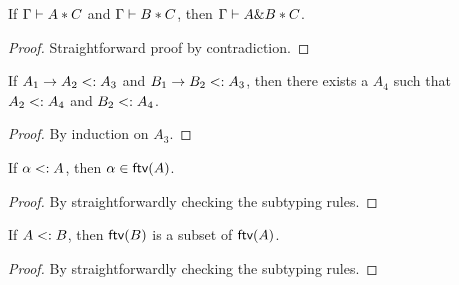 \begin{theorem}
  \label{theorem:disjoint-intersect}

  If $\Gamma \vdash A * C$ and $\Gamma \vdash B * C$,
  then $\Gamma \vdash A \& B * C$.
\end{theorem}

\begin{proof}
  Straightforward proof by contradiction.
\end{proof}

\begin{lemma}
  \label{lemma:common-supertype}

  If $A_1 \to A_2 <: A_3$ and $B_1 \to B_2 <: A_3$,
  then there exists a $A_4$ such that $A_2 <: A_4$ and $B_2 <: A_4$.
\end{lemma}

\begin{proof}
  By induction on $A_3$. 
\end{proof}

\begin{lemma}
  \label{lemma:subtype-ftv-var}

  If $\alpha <: A$, then $\alpha \in \textsf{ftv}(A)$.
\end{lemma}

\begin{proof}
  By straightforwardly checking the subtyping rules.
\end{proof}

\begin{lemma}
  \label{lemma:subtype-ftv}

  If $A <: B$, then $\textsf{ftv}(B)$ is a subset of $\textsf{ftv}(A)$.
\end{lemma}

\begin{proof}
  By straightforwardly checking the subtyping rules.
\end{proof}

\algodissoundness*

